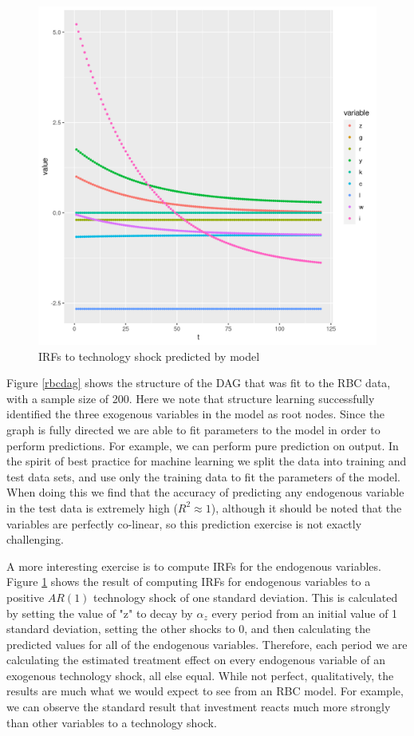 \documentclass{article}
\begin{document}
\begin{figure}
  \centering
  \includegraphics[width=\textwidth, height=0.4\textheight, keepaspectratio]{images/rbc_irf.png}
  \caption{IRFs to technology shock predicted by model}
  \label{rbcirf}
\end{figure}

Figure \ref{rbcdag} shows the structure of the DAG that was fit to the RBC data, with a sample size of 200. Here we note that structure learning successfully identified the three exogenous variables in the model as root nodes. Since the graph is fully directed we are able to fit parameters to the model in order to perform predictions. For example, we can perform pure prediction on output. In the spirit of best practice for machine learning we split the data into training and test data sets, and use only the training data to fit the parameters of the model. When doing this we find that the accuracy of predicting any endogenous variable in the test data is extremely high ($R^2 \approx 1$), although it should be noted that the variables are perfectly co-linear, so this prediction exercise is not exactly challenging. 

A more interesting exercise is to compute IRFs for the endogenous variables. Figure \ref{rbcirf} shows the result of computing IRFs for endogenous variables to a positive $AR(1)$ technology shock of one standard deviation. This is calculated by setting the value of "z" to decay by $\alpha_z$ every period from an initial value of 1 standard deviation, setting the other shocks to 0, and then calculating the predicted values for all of the endogenous variables. Therefore, each period we are calculating the estimated treatment effect on every endogenous variable of an exogenous technology shock, all else equal. While not perfect, qualitatively, the results are much what we would expect to see from an RBC model. For example, we can observe the standard result that investment reacts much more strongly than other variables to a technology shock. 
\end{document}
